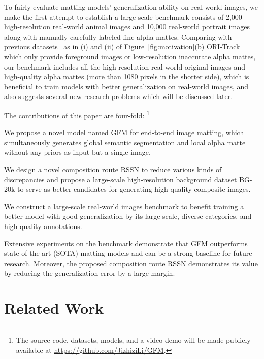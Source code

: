 \documentclass[twocolumn]{svjour3}
\begin{document}
To fairly evaluate matting models' generalization ability on real-world images, we make the first attempt to establish a large-scale benchmark consists of 2,000 high-resolution real-world animal images and 10,000 real-world portrait images along with manually carefully labeled fine alpha mattes. Comparing with previous datasets~\citep{xu2017deep,Qiao_2020_CVPR,shen2016deep} as in (i) and (ii) of Figure~\ref{fig:motivation}(b) ORI-Track which only provide foreground images or low-resolution inaccurate alpha mattes, our benchmark includes all the high-resolution real-world original images and high-quality alpha mattes (more than 1080 pixels in the shorter side), which is beneficial to train models with better generalization on real-world images, and also suggests several new research problems which will be discussed later.

The contributions of this paper are four-fold:
\footnote{The source code, datasets, models, and a video demo will be made publicly available at \url{https://github.com/JizhiziLi/GFM}.}

 We propose a novel model named GFM for end-to-end image matting, which simultaneously generates global semantic segmentation and local alpha matte without any priors as input but a single image.

 We design a novel composition route RSSN to reduce various kinds of discrepancies and propose a large-scale high-resolution background dataset BG-20k to serve as better candidates for generating high-quality composite images.


 We construct a large-scale real-world images benchmark to benefit training a better model with good generalization by its large scale, diverse categories, and high-quality annotations.

 Extensive experiments on the benchmark demonstrate that GFM outperforms state-of-the-art (SOTA) matting models and can be a strong baseline for future research. Moreover, the proposed composition route RSSN demonstrates its value by reducing the generalization error by a large margin.







\section{Related Work}
\end{document}

